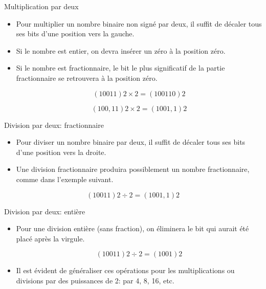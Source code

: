 \documentclass[presentation]{beamer}
\begin{document}
\begin{frame}[label={sec:org51d265c}]{Multiplication par deux}
\begin{itemize}
\item Pour multiplier un nombre binaire non signé par deux, il suffit de décaler tous ses bits d'une position vers la gauche.

\item Si le nombre est entier, on devra insérer un zéro à la position zéro.

\item Si le nombre est fractionnaire, le bit le plus significatif de la partie fractionnaire se retrouvera à la position zéro.

$$ (10011)2 \times 2 = (100110)2 $$

$$ (100,11)2 \times 2 = (1001,1)2 $$
\end{itemize}
\end{frame}

\begin{frame}[label={sec:org7e7af90}]{Division par deux: fractionnaire}
\begin{itemize}
\item Pour diviser un nombre binaire par deux, il suffit de décaler tous ses bits d'une position vers la droite.

\item Une division fractionnaire produira possiblement un nombre fractionnaire, comme dans l'exemple suivant.
\end{itemize}


$$ (10011)2 \div 2 = (1001,1)2 $$
\end{frame}

\begin{frame}[label={sec:orgf3676f8}]{Division par deux: entière}
\begin{itemize}
\item Pour une division entière (sans fraction), on éliminera le bit qui aurait été placé après la virgule.

$$ (10011)2 \div 2 = (1001)2 $$

\item Il est évident de généraliser ces opérations pour les multiplications ou divisions par des puissances de 2: par 4, 8, 16, etc.
\end{itemize}
\end{frame}
\end{document}
